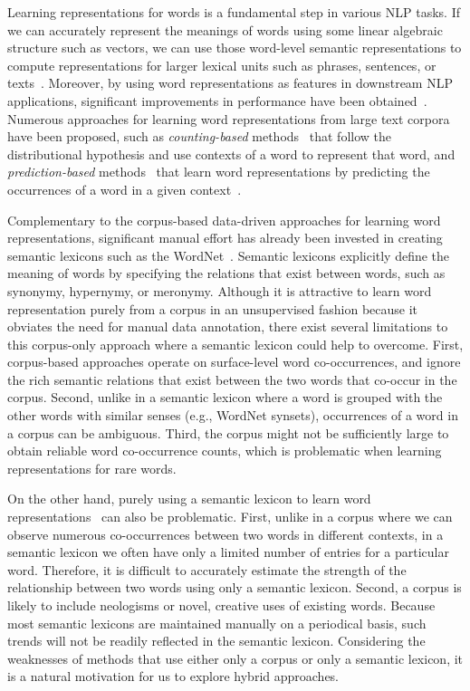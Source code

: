 \documentclass[letterpaper]{article}
\begin{document}
Learning representations for words is a fundamental step in various NLP tasks. If we can accurately represent the meanings of words
using some linear algebraic structure such as vectors, we can use those word-level semantic representations to compute
representations for larger lexical units such as phrases, sentences,
or texts~\cite{socher-EtAl:2012:EMNLP-CoNLL,Le:ICML:2014}.
Moreover, by using word representations as features in downstream NLP applications,
significant improvements in performance have been obtained~\cite{Turian:ACL:2010,Bollegala:ACL:2015,Collobert:2011}.
Numerous approaches for learning word representations from large text corpora have been proposed, such as
\emph{counting-based} methods~\cite{Turney:JAIR:2010} that follow the distributional hypothesis and use contexts
 of a word to represent that word, and \emph{prediction-based} methods~\cite{Mikolov:NIPS:2013}
 that learn word representations by predicting the occurrences
 of a word in a given context~\cite{baroni-dinu-kruszewski:2014:P14-1}.


Complementary to the corpus-based data-driven approaches for learning word representations, significant manual effort has
already been invested in creating semantic lexicons such as the WordNet~\cite{WordNet}.
Semantic lexicons explicitly define the meaning of words by
specifying the relations that exist between words, such as synonymy, hypernymy, or meronymy.
Although it is attractive to learn word representation purely from a corpus in an unsupervised fashion because it obviates the need
for manual data annotation, there exist several limitations to this corpus-only approach where a semantic lexicon could help to overcome.
First, corpus-based approaches operate on surface-level word co-occurrences, and ignore the rich semantic relations that exist
between the two words that co-occur in the corpus.
Second, unlike in a semantic lexicon where a word is grouped with the other words with similar senses (e.g., WordNet synsets),
occurrences of a word in a corpus can be ambiguous. Third, the corpus might not be sufficiently large to obtain reliable
word co-occurrence counts, which is problematic when learning representations for rare words.

On the other hand, purely using a semantic lexicon to learn word representations~\cite{Bollegala:AAAI:2015} can also be problematic.
First, unlike in a corpus where we can observe numerous co-occurrences between two words in different contexts,
in a semantic lexicon we often have only a limited number of entries for a  particular word.
Therefore, it is difficult to accurately estimate the strength of the relationship between two words using only a semantic lexicon.
Second, a corpus is likely to include neologisms or novel, creative uses of existing words.
Because most semantic lexicons are maintained manually on a periodical basis, such trends will not be readily reflected in the semantic lexicon.
Considering the weaknesses of methods that use either only a corpus or only a semantic lexicon, it is a natural motivation for us to
explore hybrid approaches.
\end{document}
